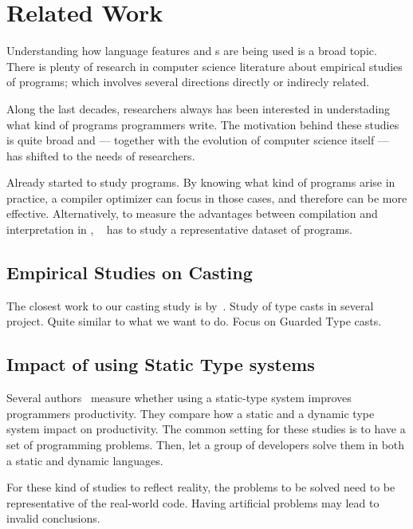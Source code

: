 
\chapter{Related Work}

Understanding how language features and \api{}s are being used is a broad topic.
There is plenty of research in computer science literature about empirical studies of programs;
which involves several directions directly or indirecly related.

Along the last decades, researchers always has been interested in understading what kind of programs programmers write.
The motivation behind these studies is quite broad and --- together with the evolution of computer science itself --- has shifted to the needs of researchers.

Already \cite{Knuth:1971jv} started to study \fortran{} programs.
By knowing what kind of programs arise in practice, a compiler optimizer can focus in those cases, and therefore can be more effective.
Alternatively, to measure the advantages between compilation and interpretation in \basic{}, ~\cite{Hammond:1977dq} has to study a representative dataset of programs.

\cite{Stefik:2014cb}


\section{Empirical Studies on Casting}

The closest work to our casting study is by~\cite{Winther:2011:GTP:2076674.2076680}.
Study of type casts in several project.
Quite similar to what we want to do.
Focus on Guarded Type casts.
\cite{Winther:2011hz}

\section{Impact of using Static Type systems}

Several authors~\cite{Stuchlik:2011:SVD:2047849.2047861,Mayer:2012:ESI:2384616.2384666,7911881} measure whether using a static-type system improves programmers productivity.
They compare how a static and a dynamic type system impact on productivity.
The common setting for these studies is to have a set of programming problems.
Then, let a group of developers solve them in both a static and dynamic languages.

For these kind of studies to reflect reality, the problems to be solved need to
be representative of the real-world code.
Having artificial problems may lead to invalid conclusions.

